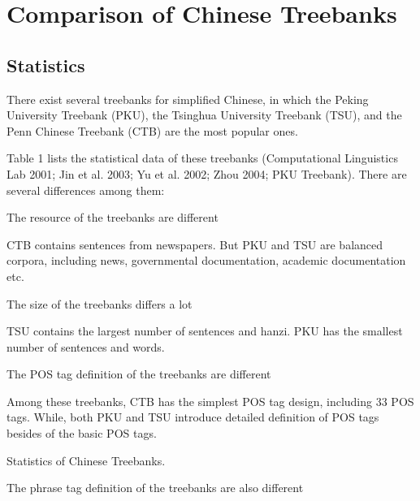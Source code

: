 \documentclass[english]{jnlp_1.4}
\renewcommand{\subsubsection}{}
\begin{document}
\section{Comparison of Chinese Treebanks}

\subsection{Statistics}

There exist several treebanks for simplified Chinese, in which the Peking 
University Treebank (PKU), the Tsinghua University Treebank (TSU), and the 
Penn Chinese Treebank (CTB) are the most popular ones. 

Table 1 lists the statistical data of these treebanks (Computational 
Linguistics Lab 2001; Jin et al. 2003; Yu et al. 2002; Zhou 2004; PKU 
Treebank). There are several differences among them:


\subsubsection{The resource of the treebanks are different} 

CTB contains sentences from newspapers. But PKU and TSU are balanced 
corpora, including news, governmental documentation, academic documentation 
etc.

\subsubsection{The size of the treebanks differs a lot}

TSU contains the largest number of sentences and hanzi. PKU has the smallest 
number of sentences and words. 

\subsubsection{The POS tag definition of the treebanks are different}

Among these treebanks, CTB has the simplest POS tag design, including 33 POS 
tags. While, both PKU and TSU introduce detailed definition of POS tags 
besides of the basic POS tags. 

\begin{table}[t]
\caption{Statistics of Chinese Treebanks.}

\end{table}

\subsubsection{The phrase tag definition of the treebanks are also different}
\end{document}
